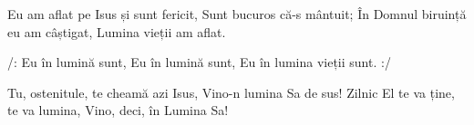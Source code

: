 \beginverse
Eu am aflat pe Isus și sunt fericit,
Sunt bucuros că-s mântuit;
În Domnul biruință eu am câștigat,
Lumina vieții am aflat.
\endverse

\beginchorus
/: Eu în lumină sunt,
Eu în lumină sunt,
Eu în lumina vieții sunt. :/
\endchorus

\beginverse
Tu, ostenitule, te cheamă azi Isus,
Vino-n lumina Sa de sus!
Zilnic El te va ține, te va lumina,
Vino, deci, în Lumina Sa!
\endverse
\endsong